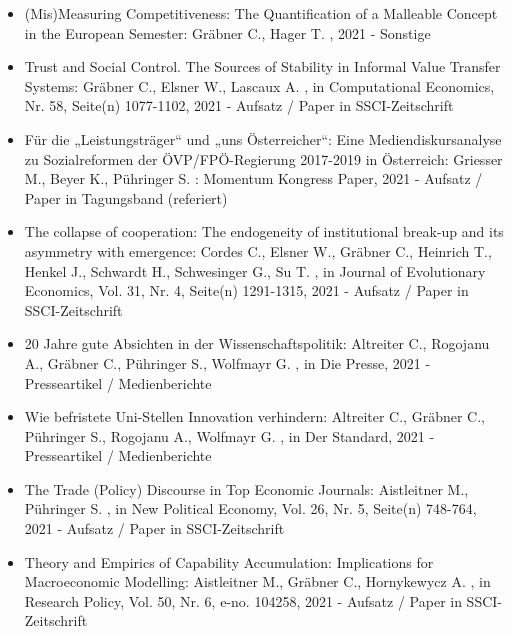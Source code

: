 \begin{itemize}
	 \item (Mis)Measuring Competitiveness:  The Quantification of a Malleable Concept in the European Semester: Gräbner C., Hager T. , 2021 - Sonstige
	 \item Trust and Social Control. The Sources of Stability in Informal Value Transfer Systems: Gräbner C., Elsner W., Lascaux A. , in Computational Economics, Nr. 58, Seite(n) 1077-1102, 2021 - Aufsatz / Paper in SSCI-Zeitschrift
	 \item Für die „Leistungsträger“ und „uns Österreicher“: Eine Mediendiskursanalyse zu Sozialreformen der ÖVP/FPÖ-Regierung 2017-2019 in Österreich: Griesser M., Beyer K., Pühringer S. : Momentum Kongress Paper, 2021 - Aufsatz / Paper in Tagungsband (referiert)
	 \item The collapse of cooperation: The endogeneity of institutional break-up and its asymmetry with emergence: Cordes C., Elsner W., Gräbner C., Heinrich T., Henkel J., Schwardt H., Schwesinger G., Su T. , in Journal of Evolutionary Economics, Vol. 31, Nr. 4, Seite(n) 1291-1315, 2021 - Aufsatz / Paper in SSCI-Zeitschrift
	 \item 20 Jahre gute Absichten in der Wissenschaftspolitik: Altreiter C., Rogojanu A., Gräbner C., Pühringer S., Wolfmayr G. , in Die Presse, 2021 - Presseartikel / Medienberichte
	 \item Wie befristete Uni-Stellen Innovation verhindern: Altreiter C., Gräbner C., Pühringer S., Rogojanu A., Wolfmayr G. , in Der Standard, 2021 - Presseartikel / Medienberichte
	 \item The Trade (Policy) Discourse in Top Economic Journals: Aistleitner M., Pühringer S. , in New Political Economy, Vol. 26, Nr. 5, Seite(n) 748-764, 2021 - Aufsatz / Paper in SSCI-Zeitschrift
	 \item Theory and Empirics of Capability Accumulation: Implications for Macroeconomic Modelling: Aistleitner M., Gräbner C., Hornykewycz A. , in Research Policy, Vol. 50, Nr. 6, e-no. 104258, 2021 - Aufsatz / Paper in SSCI-Zeitschrift
\end{itemize} 
